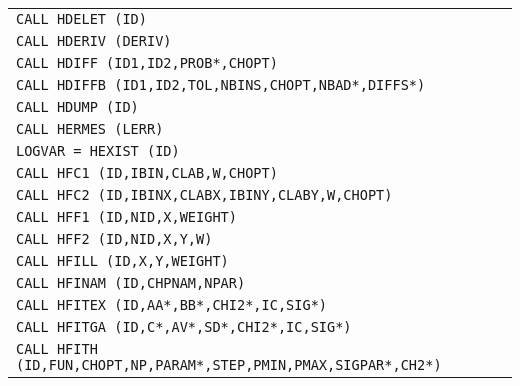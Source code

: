 \begin{longtable}{|>{\tt}p{.9\linewidth}r|}
CALL     HDELET (ID)                         
&                                                       \pageref{HDELET} \\
CALL     HDERIV (DERIV)                      
&                                                       \pageref{HDERIV} \\
CALL     HDIFF  (ID1,ID2,PROB*,CHOPT)        
&                                                       \pageref{HDIFF}  \\
CALL     HDIFFB (ID1,ID2,TOL,NBINS,CHOPT,NBAD*,DIFFS*)
&                                                       \pageref{HDIFFB} \\
CALL     HDUMP  (ID)                         
&                                                       \pageref{HDUMP}  \\
CALL     HERMES (LERR)                       
&                                                       \pageref{HERMES} \\
LOGVAR = HEXIST (ID)                         
&                                                       \pageref{HEXIST} \\
CALL     HFC1   (ID,IBIN,CLAB,W,CHOPT)
&                                                       \pageref{HFC1}   \\
CALL     HFC2   (ID,IBINX,CLABX,IBINY,CLABY,W,CHOPT)
&                                                       \pageref{HFC2}   \\
CALL     HFF1   (ID,NID,X,WEIGHT)            
&                                                       \pageref{HFF1}   \\
CALL     HFF2   (ID,NID,X,Y,W)               
&                                                       \pageref{HFF2}   \\
CALL     HFILL  (ID,X,Y,WEIGHT)              
&                                                       \pageref{HFILL}  \\
CALL     HFINAM (ID,CHPNAM,NPAR)
&                                                       \pageref{HFINAM} \\
CALL     HFITEX (ID,AA*,BB*,CHI2*,IC,SIG*)   
&                                                       \pageref{HFITEX} \\
CALL     HFITGA (ID,C*,AV*,SD*,CHI2*,IC,SIG*)
&                                                       \pageref{HFITGA} \\
CALL     HFITH  (ID,FUN,CHOPT,NP,PARAM*,STEP,PMIN,PMAX,SIGPAR*,CH2*)
&                                                       \pageref{HFITH}  \\

\end{longtable}
